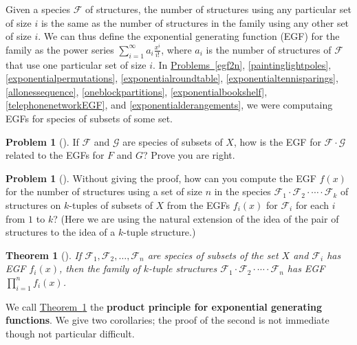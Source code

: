 \documentclass[10pt,]{book}
\newcommand{\terminology}[1]{\textbf{#1}}
\theoremstyle{plain}
\newtheorem{theorem}{Theorem}[section]
\theoremstyle{definition}
\newtheorem{activity}[project]{Problem}
\theoremstyle{definition}
\numberwithin{equation}{chapter}
\newcommand{\F}{\mathcal{F}}
\begin{document}
Given a species \(\F\) of structures, the number of structures using any particular set of size \(i\) is the same as the number of structures in the family using any other set of size \(i\).  We can thus define the exponential generating function (EGF) for the family as the power series \(\sum_{i=1}^\infty a_i \frac{x^i}{i!}\), where \(a_i\) is the number of structures of \(\F\) that use one particular set of size \(i\).  In \hyperref[egf2n]{Problems~\ref{egf2n}}, \hyperref[paintinglightpoles]{\ref{paintinglightpoles}}, \hyperref[exponentialpermutations]{\ref{exponentialpermutations}}, \hyperref[exponentialroundtable]{\ref{exponentialroundtable}}, \hyperref[exponentialtennisparings]{\ref{exponentialtennisparings}}, \hyperref[allonessequence]{\ref{allonessequence}}, \hyperref[oneblockpartitions]{\ref{oneblockpartitions}}, \hyperref[exponentialbookshelf]{\ref{exponentialbookshelf}}, \hyperref[telephonenetworkEGF]{\ref{telephonenetworkEGF}}, and \hyperref[exponentialderangements]{\ref{exponentialderangements}}, we were computaing EGFs for species of subsets of some set.%
\begin{activity}[]\marginsymbol[-1em]{} \label{activity-397}
If \(\F\) and \(\mathcal{G}\) are species of subsets of \(X\), how is the EGF for \(\F\cdot \mathcal{G}\) related to the EGFs for \(F\) and \(G\)?  Prove you are right.%
\end{activity}
\begin{activity}[]\marginsymbol[-1em]{} \label{genspeciesproduct}
Without giving the proof, how can you compute the EGF \(f(x)\) for the number of structures using a set of size \(n\) in the species \(\F_1\cdot\F_2\cdot \cdots\cdot \F_k\) of structures on \(k\)-tuples of subsets of \(X\) from the EGFs \(f_i(x)\) for \(\F_i\) for each \(i\) from \(1\) to \(k\)?  (Here we are using the natural extension of the idea of the pair of structures to the idea of a \(k\)-tuple structure.)%
\end{activity}
\begin{theorem}[{}]\label{genprodprincipleEGF}
If \(\F_1, \F_2, \ldots, \F_n\) are species of subsets of the set \(X\) and \(\F_i\) has EGF \(f_i(x)\), then the family of \(k\)-tuple structures \(\F_1\cdot \F_2\cdot \cdots\cdot \F_n\) has EGF \(\prod_{i=1}^n f_i(x)\).%
\end{theorem}
We call \hyperref[genprodprincipleEGF]{Theorem~\ref{genprodprincipleEGF}} the \terminology{product principle for exponential generating functions}. We give two corollaries; the proof of the second is not immediate though not particular difficult.%
\end{document}
